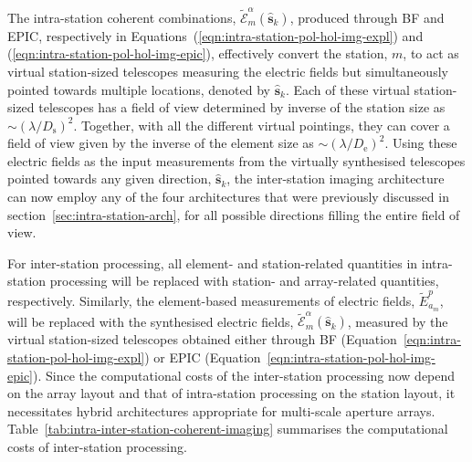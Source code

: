 \documentclass[
  journal=pasa,
  manuscript=article-type,
  year=2020,
  volume=37,
]{cup-journal}
\begin{document}
The intra-station coherent combinations, $\widetilde{\mathcal{E}}_m^\alpha(\hat{\boldsymbol{s}}_k)$, produced through BF and EPIC, respectively in Equations~(\ref{eqn:intra-station-pol-hol-img-expl}) and (\ref{eqn:intra-station-pol-hol-img-epic}), effectively convert the station, $m$, to act as virtual station-sized telescopes measuring the electric fields but simultaneously pointed towards multiple locations, denoted by $\hat{\boldsymbol{s}}_k$.
Each of these virtual station-sized telescopes has a field of view determined by inverse of the station size as $\sim (\lambda/D_\textrm{s})^2$. Together, with all the different virtual pointings, they can cover a field of view given by the inverse of the element size as $\sim (\lambda/D_\textrm{e})^2$.
Using these electric fields as the input measurements from the virtually synthesised telescopes pointed towards any given direction, $\hat{\boldsymbol{s}}_k$, the inter-station imaging architecture can now employ any of the four architectures that were previously discussed in section~\ref{sec:intra-station-arch}, for all possible directions filling the entire field of view.

For inter-station processing, all element- and station-related quantities in intra-station processing will be replaced with station- and array-related quantities, respectively. Similarly, the element-based measurements of electric fields, $\widetilde{E}_{a_m}^p$, will be replaced with the synthesised electric fields, $\widetilde{\mathcal{E}}_m^\alpha(\hat{\boldsymbol{s}}_k)$, measured by the virtual station-sized telescopes obtained either through BF (Equation~\ref{eqn:intra-station-pol-hol-img-expl}) or EPIC (Equation~\ref{eqn:intra-station-pol-hol-img-epic}).
Since the computational costs of the inter-station processing now depend on the array layout and that of intra-station processing on the station layout, it necessitates hybrid architectures appropriate for multi-scale aperture arrays. Table~\ref{tab:intra-inter-station-coherent-imaging} summarises the computational costs of inter-station processing.
\end{document}

